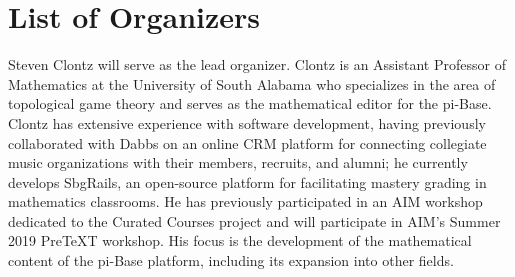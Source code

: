 \documentclass{amsart}
\newcommand{\TODO}[1]{\textcolor{red}{(TODO: #1)}}
\begin{document}



\section{List of Organizers}

Steven Clontz will serve as the lead organizer. Clontz is an Assistant
Professor of Mathematics at the University of South Alabama who specializes
in the area of topological game theory and serves as the mathematical editor
for the pi-Base. 
Clontz has extensive experience with software development, having
previously collaborated with Dabbs on an online CRM platform for connecting
collegiate music organizations with their members, recruits, and alumni;
he currently develops SbgRails, an open-source platform 
for facilitating mastery grading in mathematics classrooms. He has
previously participated in an AIM workshop dedicated to the Curated Courses
project and will participate in AIM's Summer 2019 PreTeXT workshop. 
His focus is the development of the mathematical content
of the pi-Base platform, including its expansion into other fields.
\end{document}
